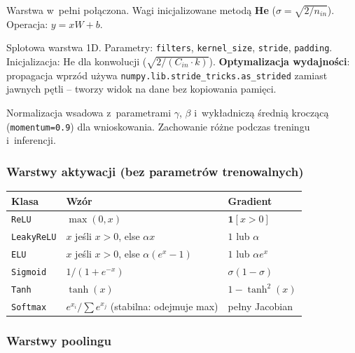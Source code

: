 \documentclass[12pt,a4paper]{article}
\begin{document}
\begin{description}[leftmargin=3cm]
  \item[\texttt{Dense}] Warstwa w~pełni połączona. Wagi inicjalizowane metodą \textbf{He} ($\sigma = \sqrt{2/n_{in}}$). Operacja: $y = xW + b$.

  \item[\texttt{Conv1D}] Splotowa warstwa 1D. Parametry: \texttt{filters}, \texttt{kernel\_size}, \texttt{stride}, \texttt{padding}. Inicjalizacja: He dla konwolucji ($\sqrt{2 / (C_{in} \cdot k)}$). \textbf{Optymalizacja wydajności}: propagacja wprzód używa \texttt{numpy.lib.stride\_tricks.as\_strided} zamiast jawnych pętli -- tworzy widok na dane bez kopiowania pamięci.

  \item[\texttt{BatchNormalization}] Normalizacja wsadowa z~parametrami $\gamma$, $\beta$ i~wykładniczą średnią kroczącą (\texttt{momentum=0.9}) dla wnioskowania. Zachowanie różne podczas treningu i~inferencji.
\end{description}

\subsubsection*{Warstwy aktywacji (bez parametrów trenowalnych)}

\begin{center}
\begin{tabular}{@{}lll@{}}
\toprule
Klasa & Wzór & Gradient \\
\midrule
\texttt{ReLU}      & $\max(0, x)$                                  & $\mathbf{1}[x > 0]$ \\
\texttt{LeakyReLU} & $x$ jeśli $x>0$, else $\alpha x$              & $1$ lub $\alpha$ \\
\texttt{ELU}       & $x$ jeśli $x>0$, else $\alpha(e^x - 1)$      & $1$ lub $\alpha e^x$ \\
\texttt{Sigmoid}   & $1/(1+e^{-x})$                                & $\sigma(1-\sigma)$ \\
\texttt{Tanh}      & $\tanh(x)$                                    & $1 - \tanh^2(x)$ \\
\texttt{Softmax}   & $e^{x_i}/\sum e^{x_j}$ (stabilna: odejmuje max) & pełny Jacobian \\
\bottomrule
\end{tabular}
\end{center}

\subsubsection*{Warstwy poolingu}
\end{document}
